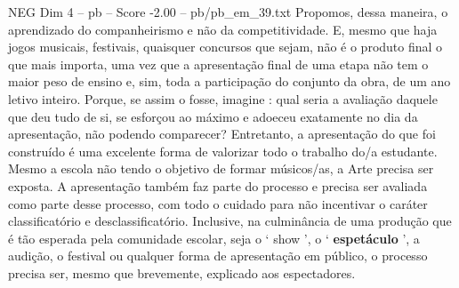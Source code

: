 \begin{textsample}{NEG Dim 4 – pb – Score -2.00 – pb/pb\_em\_39.txt}
Propomos, dessa maneira, o aprendizado do companheirismo e não da competitividade.
E, mesmo que haja jogos musicais, festivais, quaisquer concursos que sejam, não é o produto final o que mais importa, uma vez que a apresentação final de uma etapa não tem o maior peso de ensino e, sim, toda a participação do conjunto da obra, de um ano letivo inteiro.
Porque, se assim o fosse, imagine : qual seria a avaliação daquele que deu tudo de si, se esforçou ao máximo e adoeceu exatamente no dia da apresentação, não podendo comparecer?
Entretanto, a apresentação do que foi construído é uma excelente forma de valorizar todo o trabalho do/a estudante.
Mesmo a escola não tendo o objetivo de formar músicos/as, a Arte precisa ser exposta.
A apresentação também faz parte do processo e precisa ser avaliada como parte desse processo, com todo o cuidado para não incentivar o caráter classificatório e desclassificatório.
Inclusive, na culminância de uma produção que é tão esperada pela comunidade escolar, seja o ‘ show ’, o ‘ \textbf{espetáculo} ’, a audição, o festival ou qualquer forma de apresentação em público, o processo precisa ser, mesmo que brevemente, explicado aos espectadores.

\end{textsample}
